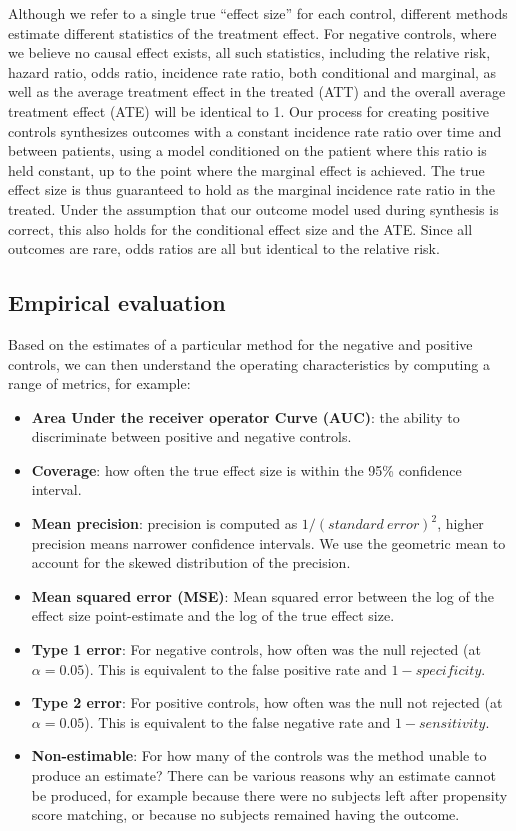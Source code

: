 \documentclass[11pt]{book}
\providecommand{\tightlist}{%
  \setlength{\itemsep}{0pt}\setlength{\parskip}{0pt}}
\theoremstyle{definition}
\theoremstyle{definition}
\theoremstyle{definition}
\theoremstyle{remark}
\begin{document}
Although we refer to a single true ``effect size'' for each control, different methods estimate different statistics of the treatment effect. For negative controls, where we believe no causal effect exists, all such statistics, including the relative risk, hazard ratio, odds ratio, incidence rate ratio, both conditional and marginal, as well as the average treatment effect in the treated (ATT) and the overall average treatment effect (ATE) will be identical to 1. Our process for creating positive controls synthesizes outcomes with a constant incidence rate ratio over time and between patients, using a model conditioned on the patient where this ratio is held constant, up to the point where the marginal effect is achieved. The true effect size is thus guaranteed to hold as the marginal incidence rate ratio in the treated. Under the assumption that our outcome model used during synthesis is correct, this also holds for the conditional effect size and the ATE. Since all outcomes are rare, odds ratios are all but identical to the relative risk.

\hypertarget{metrics}{%
\subsection{Empirical evaluation}\label{metrics}}

Based on the estimates of a particular method for the negative and positive controls, we can then understand the operating characteristics by computing a range of metrics, for example:

\begin{itemize}
\tightlist
\item
  \textbf{Area Under the receiver operator Curve (AUC)}: the ability to discriminate between positive and negative controls.
\item
  \textbf{Coverage}: how often the true effect size is within the 95\% confidence interval.
\item
  \textbf{Mean precision}: precision is computed as \(1/(standard\ error)^2\), higher precision means narrower confidence intervals. We use the geometric mean to account for the skewed distribution of the precision.
\item
  \textbf{Mean squared error (MSE)}: Mean squared error between the log of the effect size point-estimate and the log of the true effect size.
\item
  \textbf{Type 1 error}: For negative controls, how often was the null rejected (at \(\alpha = 0.05\)). This is equivalent to the false positive rate and \(1 - specificity\).
\item
  \textbf{Type 2 error}: For positive controls, how often was the null not rejected (at \(\alpha = 0.05\)). This is equivalent to the false negative rate and \(1 - sensitivity\).
\item
  \textbf{Non-estimable}: For how many of the controls was the method unable to produce an estimate? There can be various reasons why an estimate cannot be produced, for example because there were no subjects left after propensity score matching, or because no subjects remained having the outcome.
\end{itemize}
\end{document}
